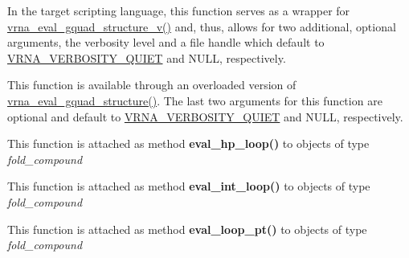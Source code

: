 \begin{DoxyRefList}
\item[\label{wrappers__wrappers000043}%
\Hypertarget{wrappers__wrappers000043}%
Global \hyperlink{group__eval_ga3263504825ef4b523eba797c99921df4}{vrna\+\_\+eval\+\_\+gquad\+\_\+structure} (const char $\ast$string, const char $\ast$structure)]In the target scripting language, this function serves as a wrapper for \hyperlink{group__eval_gaeaa2bdbc1b5d78c667e735fbdff87fff}{vrna\+\_\+eval\+\_\+gquad\+\_\+structure\+\_\+v()} and, thus, allows for two additional, optional arguments, the verbosity level and a file handle which default to \hyperlink{group__eval_gaf4afe19780b61b4962c613bde324128b}{V\+R\+N\+A\+\_\+\+V\+E\+R\+B\+O\+S\+I\+T\+Y\+\_\+\+Q\+U\+I\+ET} and N\+U\+LL, respectively.  
\item[\label{wrappers__wrappers000053}%
\Hypertarget{wrappers__wrappers000053}%
Global \hyperlink{group__eval_gaeaa2bdbc1b5d78c667e735fbdff87fff}{vrna\+\_\+eval\+\_\+gquad\+\_\+structure\+\_\+v} (const char $\ast$string, const char $\ast$structure, int verbosity\+\_\+level, F\+I\+LE $\ast$file)]This function is available through an overloaded version of \hyperlink{group__eval_ga3263504825ef4b523eba797c99921df4}{vrna\+\_\+eval\+\_\+gquad\+\_\+structure()}. The last two arguments for this function are optional and default to \hyperlink{group__eval_gaf4afe19780b61b4962c613bde324128b}{V\+R\+N\+A\+\_\+\+V\+E\+R\+B\+O\+S\+I\+T\+Y\+\_\+\+Q\+U\+I\+ET} and N\+U\+LL, respectively.  
\item[\label{wrappers__wrappers000039}%
\Hypertarget{wrappers__wrappers000039}%
Global \hyperlink{group__eval__loops__hp_gad0bb844f8dc704c71737ae1d7e32b975}{vrna\+\_\+eval\+\_\+hp\+\_\+loop} (vrna\+\_\+fold\+\_\+compound\+\_\+t $\ast$fc, int i, int j)]This function is attached as method {\bfseries eval\+\_\+hp\+\_\+loop()} to objects of type {\itshape fold\+\_\+compound}  
\item[\label{wrappers__wrappers000040}%
\Hypertarget{wrappers__wrappers000040}%
Global \hyperlink{group__eval__loops__int_gaab3547bfcdc39d89babbc7ed2a1a4b65}{vrna\+\_\+eval\+\_\+int\+\_\+loop} (vrna\+\_\+fold\+\_\+compound\+\_\+t $\ast$fc, int i, int j, int k, int l)]This function is attached as method {\bfseries eval\+\_\+int\+\_\+loop()} to objects of type {\itshape fold\+\_\+compound}  
\item[\label{wrappers__wrappers000036}%
\Hypertarget{wrappers__wrappers000036}%
Global \hyperlink{group__eval__loops_ga730ba4df55c02fd530a0cddd49faf760}{vrna\+\_\+eval\+\_\+loop\+\_\+pt} (vrna\+\_\+fold\+\_\+compound\+\_\+t $\ast$vc, int i, const short $\ast$pt)]This function is attached as method {\bfseries eval\+\_\+loop\+\_\+pt()} to objects of type {\itshape fold\+\_\+compound}  

\end{DoxyRefList}
